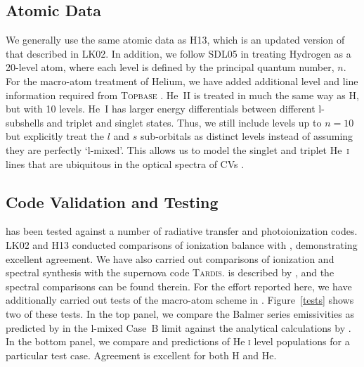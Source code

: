 \documentclass[preprint, a4paper, 11pt]{aastex}
\begin{document}
\subsection{Atomic Data}

We generally use the same atomic data as H13, which is an updated
version of that described in LK02. In addition, we follow SDL05 in
treating Hydrogen as a 20-level atom, where each level is defined by
the principal quantum number, $n$. For the macro-atom treatment of
Helium,  we have added additional level and line information required 
from \textsc{Topbase} \citep{topbase2005}.  He~\textsc{II} is treated
in much the same way as H, but with 10 levels. He~\textsc{I} has
larger energy differentials between different l-subshells and triplet
and singlet states. Thus, we still include levels up to $n=10$ but
explicitly treat the $l$ and $s$ sub-orbitals as distinct levels
instead of assuming they are perfectly `l-mixed'. This allows us
to model the singlet and  triplet He~\textsc{i} lines that are ubiquitous
in the optical spectra of CVs \citep[e.g.][]{dhillon1996}.


\subsection{Code Validation and Testing}

\py has been tested against a number of radiative transfer and
photoionization codes. LK02 and H13 conducted comparisons of 
ionization balance  with \cld \citep{cloudy2013}, demonstrating
excellent agreement. We have also carried out comparisons
of ionization and spectral synthesis with the supernova code
\textsc{Tardis.} \tar is described by 
\cite{kerzendorfsim}, and the spectral comparisons can be found
therein. For the effort reported here, we have additionally carried
out tests of the macro-atom scheme in \py. Figure~\ref{tests} shows
two of these tests. In the top panel, we compare the Balmer series 
emissivities as predicted by \py in the l-mixed Case~B limit against the
analytical calculations by \cite{seaton1959}. In the bottom panel, we
compare \py and \tar predictions of  He \textsc{i} level populations
for a particular test case. Agreement is excellent for both H and He.
\end{document}
